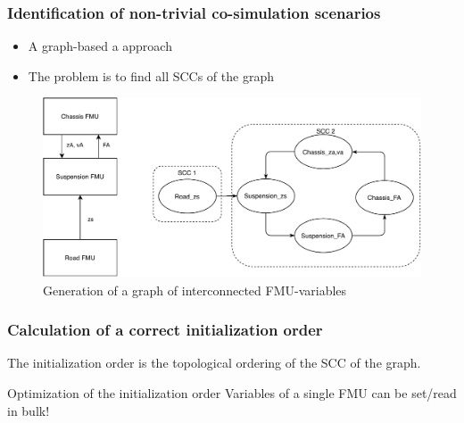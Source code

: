 \documentclass{beamer}
\begin{document}
\begin{frame}
\frametitle{Identification of non-trivial co-simulation scenarios}
\begin{itemize}
    \item A graph-based a approach 
    \item The problem is to find all SCCs of the graph
\end{itemize}
\begin{figure}
    \centering
    \includegraphics[scale=0.6]{images/quarter_car_SCC.pdf}
    \caption{Generation of a graph of interconnected FMU-variables}
\end{figure}
\end{frame}

\begin{frame}
\frametitle{Calculation of a correct initialization order}
The initialization order is the topological ordering of the SCC of the graph.

\begin{exampleblock}{Optimization of the initialization order}
Variables of a single FMU can be set/read in bulk!
\end{exampleblock}
\end{frame}
\end{document}
